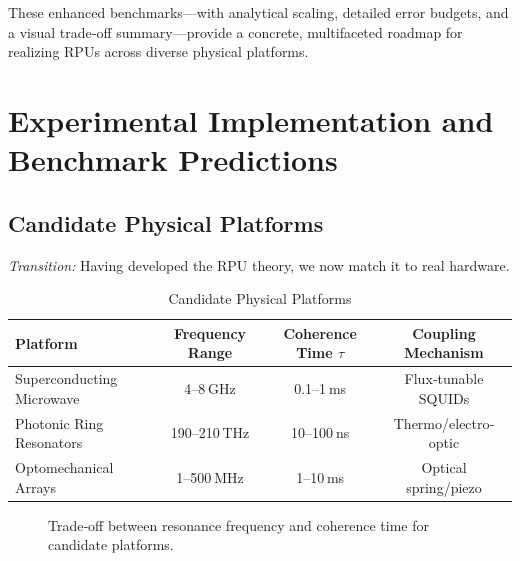 These enhanced benchmarks—with analytical scaling, detailed error budgets, and a visual trade‐off summary—provide a concrete, multifaceted roadmap for realizing RPUs across diverse physical platforms.

\section{Experimental Implementation and Benchmark Predictions}

\subsection{Candidate Physical Platforms}
\emph{Transition:} Having developed the RPU theory, we now match it to real hardware.

\begin{table}[ht]
  \centering
  \caption{Candidate Physical Platforms}
  \label{tab:platforms}
  \begin{tabular}{@{}lccc@{}}
    \toprule
    Platform                   & Frequency Range          & Coherence Time $\tau$       & Coupling Mechanism \\
    \midrule
    Superconducting Microwave  & 4–8 GHz                  & 0.1–1 ms                    & Flux‐tunable SQUIDs \\
    Photonic Ring Resonators   & 190–210 THz               & 10–100 ns                   & Thermo/electro‐optic \\
    Optomechanical Arrays      & 1–500 MHz                & 1–10 ms                     & Optical spring/piezo \\
    \bottomrule
  \end{tabular}
\end{table}

\begin{figure}[ht]
  \centering
  \caption{Trade‐off between resonance frequency and coherence time for candidate platforms.}
  \label{fig:tradeoff}
\end{figure}


